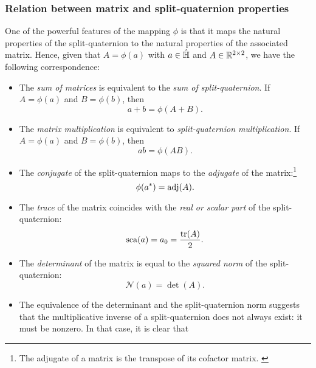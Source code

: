 \subsubsection{Relation between matrix and split-quaternion properties} 
One of the powerful features of the mapping \(\phi\) is that it maps the natural properties of the split-quaternion to the natural properties of the associated matrix. Hence, given that \(A = \phi(a)\) with \(a \in \hat{\mathbb{H}}\) and \(A \in \mathbb{R}^{2\times2}\), we have the following correspondence: 
\begin{itemize}
    \item The \emph{sum of matrices} is equivalent to the \emph{sum of split-quaternion}. If \(A = \phi(a)\) and \(B = \phi(b)\), then
        \begin{equation}
            a + b = \phi(A + B).
        \end{equation}
    \item The \emph{matrix multiplication} is equivalent to \emph{split-quaternion multiplication}. If \(A = \phi(a)\) and \(B = \phi(b)\), then
        \begin{equation}
             ab = \phi(AB).
        \end{equation}
    \item The \emph{conjugate} of the split-quaternion maps to the \emph{adjugate} of the matrix:\footnote
        {The adjugate of a matrix is the transpose of its cofactor matrix. \cite{Verhaegen2007}}
        \begin{equation}
             \phi(a^*) = \operatorname{adj}(A).
        \end{equation}
    \item The \emph{trace} of the matrix coincides with the \emph{real or scalar part} of the split-quaternion:
        \begin{equation}
             \scapart{a} = a_0 = \frac{\trace(A)}{2}.
        \end{equation}
    \item The \emph{determinant} of the matrix is equal to the \emph{squared norm} of the split-quaternion:
        \begin{equation}
             \mathscr{N}(a) = \det(A).
        \end{equation}
    \item The equivalence of the determinant and the split-quaternion norm suggests that the multiplicative inverse of a split-quaternion does not always exist: it must be nonzero. In that case, it is clear that
        \begin{equation}

\end{equation}
\end{itemize}
